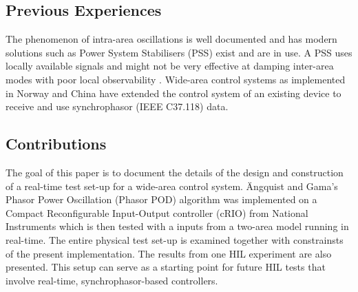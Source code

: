 \documentclass[conference]{IEEEtran}
\begin{document}
\subsection{Previous Experiences}
The phenomenon of intra-area oscillations is well documented and has modern solutions such as Power System Stabilisers (PSS) exist and are in use. A PSS uses locally available signals and might not be very effective at damping inter-area modes with poor local observability \cite{Yuwa}\cite{localREMcomparison}. Wide-area control systems as implemented in Norway \cite{WAPODNorway} and China \cite{WAPODChina} have extended the control system of an existing device to receive and use synchrophasor (IEEE C37.118) data.
\subsection{Contributions}
The goal of this paper is to document the details of the design and construction of a real-time test set-up for a wide-area control system. \"{A}ngquist and Gama's\cite{PhasorPOD} Phasor Power Oscillation (Phasor POD) algorithm was implemented on a Compact Reconfigurable Input-Output controller (cRIO) \cite{cRIO9081} from National Instruments which is then tested with a inputs from a two-area model\cite{KundurTwoArea} running in real-time. The entire physical test set-up is examined together with constrainsts of the present implementation. The results from one HIL experiment are also presented. This setup can serve as a starting point for future HIL tests that involve real-time, synchrophasor-based controllers.
\end{document}
